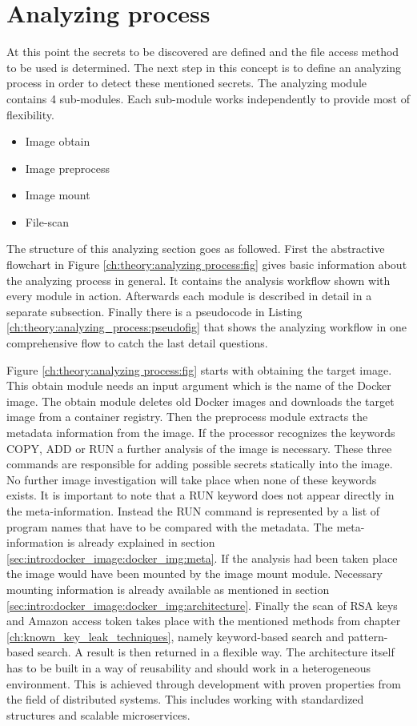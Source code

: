 \section{Analyzing process}
\label{ch:theory:analyzing_process}
At this point the secrets to be discovered are defined and the file access method to be used is determined. 
The next step in this concept is to define an analyzing process in order to detect these mentioned secrets.
The analyzing module contains 4 sub-modules.
Each sub-module works independently to provide most of flexibility.
\begin{itemize}
\item Image obtain
\item Image preprocess
\item Image mount
\item File-scan
\end{itemize}
The structure of this analyzing section goes as followed.
First the abstractive flowchart in Figure \ref{ch:theory:analyzing process:fig} gives basic information about the analyzing process in general. 
It contains the analysis workflow shown with every module in action. 
Afterwards each module is described in detail in a separate subsection.
Finally there is a pseudocode in Listing \ref{ch:theory:analyzing_process:pseudofig} that shows the analyzing workflow in one comprehensive flow to catch the last detail questions.

Figure \ref{ch:theory:analyzing process:fig} starts with obtaining the target image. 
This obtain module needs an input argument which is the name of the Docker image.
The obtain module deletes old Docker images and downloads the target image from a container registry. 
Then the preprocess module extracts the metadata information from the image. 
If the processor recognizes the keywords COPY, ADD or RUN a further analysis of the image is necessary.
These three commands are responsible for adding possible secrets statically into the image.
No further image investigation will take place when none of these keywords exists. 
It is important to note that a RUN keyword does not appear directly in the meta-information. 
Instead the RUN command is represented by a list of program names that have to be compared with the metadata.
The meta-information is already explained in section \ref{sec:intro:docker_image:docker_img:meta}.
If the analysis had been taken place the image would have been mounted by the image mount module.
Necessary mounting information is already available as mentioned in section \ref{sec:intro:docker_image:docker_img:architecture}.
Finally the scan of RSA keys and Amazon access token takes place with the mentioned methods from chapter \ref{ch:known_key_leak_techniques}, namely keyword-based search and pattern-based search. A result is then returned in a flexible way.
The architecture itself has to be built in a way of reusability and should work in a heterogeneous environment.
This is achieved through development with proven properties from the field of distributed systems. 
This includes working with standardized structures and scalable microservices.

